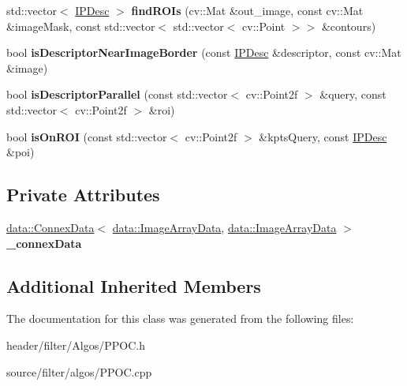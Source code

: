 \begin{DoxyCompactItemize}
\item 
\mbox{\label{classfilter_1_1algos_1_1_p_p_o_c_acccbb7ea1dcdb857a85d2d4335b66e32}} 
std\+::vector$<$ \hyperlink{classfilter_1_1algos_1_1_i_p_desc}{I\+P\+Desc} $>$ {\bfseries find\+R\+O\+Is} (cv\+::\+Mat \&out\+\_\+image, const cv\+::\+Mat \&image\+Mask, const std\+::vector$<$ std\+::vector$<$ cv\+::\+Point $>$$>$ \&contours)
\item 
\mbox{\label{classfilter_1_1algos_1_1_p_p_o_c_ac1c65b1e9f0c6fb3b260737d9d7f02c6}} 
bool {\bfseries is\+Descriptor\+Near\+Image\+Border} (const \hyperlink{classfilter_1_1algos_1_1_i_p_desc}{I\+P\+Desc} \&descriptor, const cv\+::\+Mat \&image)
\item 
\mbox{\label{classfilter_1_1algos_1_1_p_p_o_c_af9bd40e1e283fe460ba82c995b5a918d}} 
bool {\bfseries is\+Descriptor\+Parallel} (const std\+::vector$<$ cv\+::\+Point2f $>$ \&query, const std\+::vector$<$ cv\+::\+Point2f $>$ \&roi)
\item 
\mbox{\label{classfilter_1_1algos_1_1_p_p_o_c_a65859622bde82dd9d856ddb4efaa8df4}} 
bool {\bfseries is\+On\+R\+OI} (const std\+::vector$<$ cv\+::\+Point2f $>$ \&kpts\+Query, const \hyperlink{classfilter_1_1algos_1_1_i_p_desc}{I\+P\+Desc} \&poi)
\end{DoxyCompactItemize}
\subsection*{Private Attributes}
\begin{DoxyCompactItemize}
\item 
\mbox{\label{classfilter_1_1algos_1_1_p_p_o_c_a0a064180077813f57ced4c3758de50ff}} 
\hyperlink{classfilter_1_1data_1_1_connex_data}{data\+::\+Connex\+Data}$<$ \hyperlink{classfilter_1_1data_1_1_image_array_data}{data\+::\+Image\+Array\+Data}, \hyperlink{classfilter_1_1data_1_1_image_array_data}{data\+::\+Image\+Array\+Data} $>$ {\bfseries \+\_\+connex\+Data}
\end{DoxyCompactItemize}
\subsection*{Additional Inherited Members}


The documentation for this class was generated from the following files\+:\begin{DoxyCompactItemize}
\item 
header/filter/\+Algos/P\+P\+O\+C.\+h\item 
source/filter/algos/P\+P\+O\+C.\+cpp\end{DoxyCompactItemize}
